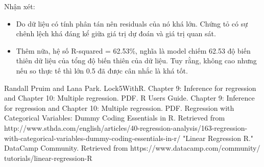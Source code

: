 \documentclass[a4paper,12pt]{article}
\begin{document}
	Nhận xét:
	\begin{itemize}
		\item Do dữ liệu có tính phân tán nên residuals của nó khá lớn. Chứng tỏ có sự chênh lệch khá đáng kể giữa giá trị dự đoán và giá trị quan sát.
		\item Thêm nữa, hệ số R-squared = 62.53\%, nghĩa là model chiếm 62.53 độ biến thiên dữ liệu của tổng độ biến thiên của dữ liệu. Tuy rằng, không cao nhưng nếu so thực tế thì lớn 0.5 đã được cân nhắc là khá tốt. 
	\end{itemize}
	
	\begin{thebibliography}{00}
		 Randall Pruim and Lana Park. Lock5WithR. Chapter 9: Inference for regression and Chapter 10: Multiple regression. PDF.
		 R Users Guide. Chapter 9: Inference for regression and Chapter 10: Multiple regression. PDF.
		 Regression with Categorical Variables: Dummy Coding Essentials in R. Retrieved from http://www.sthda.com/english/articles/40-regression-analysis/163-regression-with-categorical-variables-dummy-coding-essentials-in-r/
		 "Linear Regression R." DataCamp Community. Retrieved from https://www.datacamp.com/community/
		tutorials/linear-regression-R
	\end{thebibliography}
\end{document}
